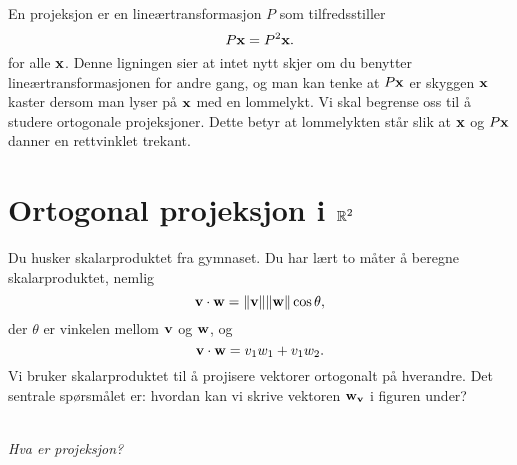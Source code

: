 

\label{ch:projeksjon}

En projeksjon er en lineærtransformasjon $P$ som tilfredsstiller
\[
 P\mathbf{x}=P^2\mathbf{x}.
 \]
 for alle $\mathbf{x}$. Denne ligningen sier at intet nytt skjer om du benytter lineærtransformasjonen for andre gang,
 og man kan tenke at $ P\mathbf{x}$ er skyggen $\mathbf{x}$ kaster dersom man lyser på $\mathbf{x}$ med en lommelykt.
Vi skal begrense oss til å studere ortogonale projeksjoner. 
Dette betyr at lommelykten står slik at $\mathbf{x}$ og $P\mathbf{x}$ danner en rettvinklet trekant.

 
 \section*{Ortogonal projeksjon i $\mathbb{R}^2$}
 Du husker skalarproduktet fra gymnaset.
  Du har lært to måter å beregne skalarproduktet, nemlig
\[
 \mathbf{v}\cdot  \mathbf{w} = \|\mathbf{v}\| \|\mathbf{w}\| \cos \theta,
 \] 
der $\theta$ er vinkelen mellom $\mathbf{v}$ og $\mathbf{w}$, og 
\[
 \mathbf{v}\cdot  \mathbf{w} = v_1 w_1+v_1w_2.
 \] 
Vi bruker skalarproduktet til å projisere vektorer ortogonalt på hverandre. Det sentrale spørsmålet er: hvordan kan vi skrive vektoren $\mathbf{w}_{\mathbf{v}}$ i figuren under? 
 \begin{center}
\\
{\small \textit{Hva er projeksjon?}}
\end{center}
